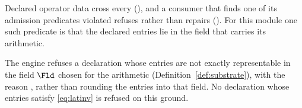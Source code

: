 
Declared operator data cross every  
(), and a consumer that finds one of
its admission predicates violated refuses rather than repairs
(). For this module one
such predicate is that the declared entries lie in the field that carries its
arithmetic.

\begin{requirement}\label{req:exact-admission-refusal}
The engine refuses a declaration whose entries are not exactly representable
in the field $\Fld$ chosen for the arithmetic
(Definition~\ref{def:substrate}), with the reason
, rather than rounding the entries
into that field. No declaration whose entries satisfy \eqref{eq:latinv} is
refused on this ground.
\end{requirement}
